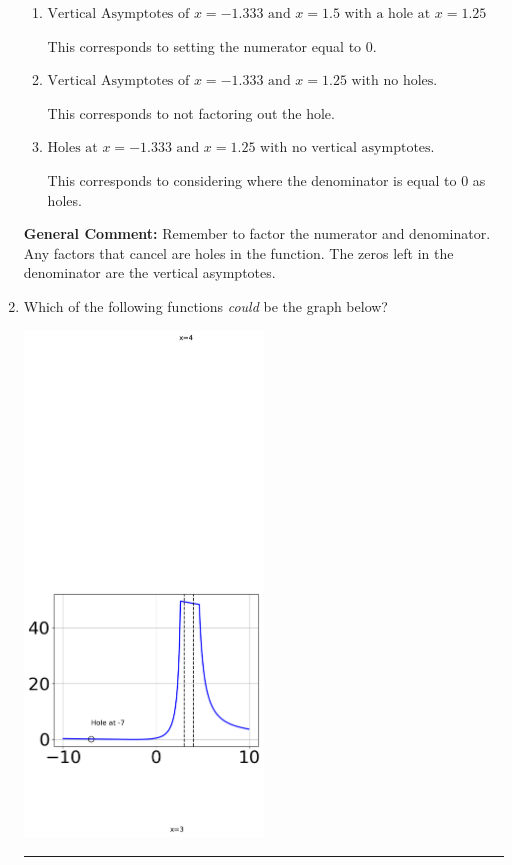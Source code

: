 \documentclass{extbook}[14pt]
\newcommand{\litem}[1]{\item #1

\rule{\textwidth}{0.4pt}}
\begin{document}
\begin{enumerate}
{\begin{enumerate}[label=\Alph*.]
This is the correct answer.
\item \( \text{Vertical Asymptotes of } x = -1.333 \text{ and } x = 1.5 \text{ with a hole at } x = 1.25 \)

This corresponds to setting the numerator equal to 0.
\item \( \text{Vertical Asymptotes of } x = -1.333 \text{ and } x = 1.25 \text{ with no holes.} \)

This corresponds to not factoring out the hole.
\item \( \text{Holes at } x = -1.333 \text{ and } x = 1.25 \text{ with no vertical asymptotes.} \)

This corresponds to considering where the denominator is equal to 0 as holes.
\end{enumerate}

\textbf{General Comment:} Remember to factor the numerator and denominator. Any factors that cancel are holes in the function. The zeros left in the denominator are the vertical asymptotes.
}
\litem{
Which of the following functions \textit{could} be the graph below?

\begin{center}
    \includegraphics[width=0.5\textwidth]{../Figures/identifyGraphOfRationalFunctionCopyC.png}
\end{center}


}
\end{enumerate}
\end{document}
